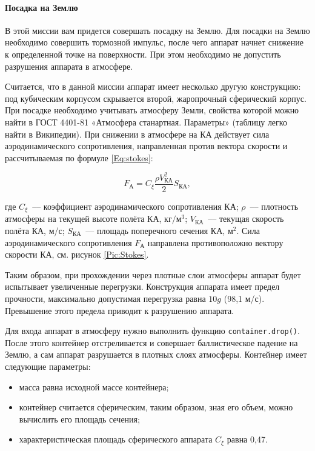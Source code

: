 \documentclass[12pt,a4paper]{article}
\begin{document}
\paragraph{Посадка на Землю}

В этой миссии вам придется совершать посадку на Землю. Для посадки на Землю необходимо
совершить тормозной импульс, после чего аппарат начнет снижение к определенной точке на
поверхности. При этом необходимо не допустить разрушения аппарата в атмосфере.

Считается, что в данной миссии аппарат имеет несколько другую конструкцию: под кубическим
корпусом скрывается второй, жаропрочный сферический корпус.  При посадке необходимо
учитывать атмосферу Земли, свойства которой можно найти в ГОСТ 4401-81 «Атмосфера
станартная. Параметры» (таблицу легко найти в Википедии). При снижении в атмосфере на КА
действует сила аэродинамического сопротивления, направленная против вектора скорости и
рассчитываемая по формуле \ref{Eq:stokes}:

$$
  F_{\text{А}} = C_\xi \frac{\rho V_{\text{КА}}^2}{2} S_{\text{КА}}, 
  $$
  
где $C_\xi$~--– коэффициент аэродинамического сопротивления КА; $\rho$~--– плотность
атмосферы на текущей высоте полёта КА, $\text{кг}/\text{м}^3$; $V_{\text{КА}}$~--– текущая
скорость полёта КА, м/с; $S_{\text{КА}}$~--– площадь поперечного сечения КА,
$\text{м}^2$. Сила аэродинамического сопротивления $F_{\text{А}}$ направлена
противоположно вектору скорости КА, см. рисунок \ref{Pic:Stokes}.

Таким образом, при прохождении через плотные слои атмосферы аппарат будет испытывает
увеличенные перегрузки. Конструкция аппарата имеет предел прочности, максимально
допустимая перегрузка равна $10g$ (98,1 м/с). Превышение этого предела приводит к разрушению
аппарата.

Для входа аппарат в атмосферу нужно выполнить функцию \verb'container.drop()'. После этого
контейнер отстреливается и совершает баллистическое падение на Землю, а сам аппарат
разрушается в плотных слоях атмосферы. Контейнер имеет следующие параметры:

\begin{itemize}
  \item масса равна исходной массе контейнера;
  \item контейнер считается сферическим, таким образом, зная его объем, можно вычислить его площадь сечения;
  \item характеристическая площадь сферического аппарата $C_{\xi}$ равна 0,47.
\end{itemize}
\end{document}
